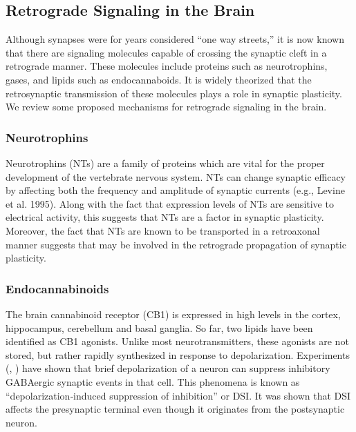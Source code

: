 \documentclass[12pt]{article}
\begin{document}
\subsection{Retrograde Signaling in the Brain}
Although synapses were for years considered ``one way streets,'' it is now known that there are signaling molecules capable of crossing the synaptic cleft in a retrograde manner. \cite{Tao2001} These molecules include proteins such as neurotrophins, \cite{Dechant2003} gases, \cite{RodriguezGrande2017} and lipids such as endocannaboids. \cite{Mechoulam1998} It is widely theorized that the retrosynaptic transmission of these molecules plays a role in synaptic plasticity. \cite{EAlger2002}\cite{Schuman1999} We review some proposed mechanisms for retrograde signaling in the brain.

\subsubsection{Neurotrophins}
Neurotrophins (NTs) are a family of proteins which are vital for the proper development of the vertebrate nervous system. \cite{Tao2001} NTs can change synaptic efficacy by affecting both the frequency and amplitude of synaptic currents (e.g., Levine et al. 1995). Along with the fact that expression levels of NTs are sensitive to electrical activity, this suggests that NTs are a factor in synaptic plasticity. Moreover, the fact that NTs are known to be transported in a retroaxonal manner \cite{Hendry1974} suggests that may be involved in the retrograde propagation of synaptic plasticity.

\subsubsection{Endocannabinoids}
The brain cannabinoid receptor (CB1) is expressed in high levels in the cortex, hippocampus, cerebellum and basal ganglia. \cite{Wilson2002} So far, two lipids have been identified as CB1 agonists. Unlike most neurotransmitters, these agonists are not stored, but rather rapidly synthesized in response to depolarization. Experiments (\cite{Pitler1992}, \cite{Llano1991}) have shown that brief depolarization of a neuron can suppress inhibitory GABAergic synaptic events in that cell. This phenomena is known as ``depolarization‐induced suppression of inhibition'' or DSI. It was shown that DSI affects the presynaptic terminal even though it originates from the postsynaptic neuron.
\end{document}
